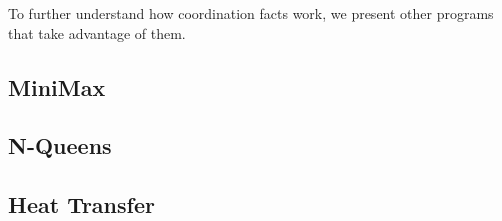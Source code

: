 To further understand how coordination facts work, we present other programs that
take advantage of them.

\subsection{MiniMax}\label{section:coord:minimax}

\subsection{N-Queens}\label{section:coord:nqueens}

\subsection{Heat Transfer}\label{section:coord:ht}


